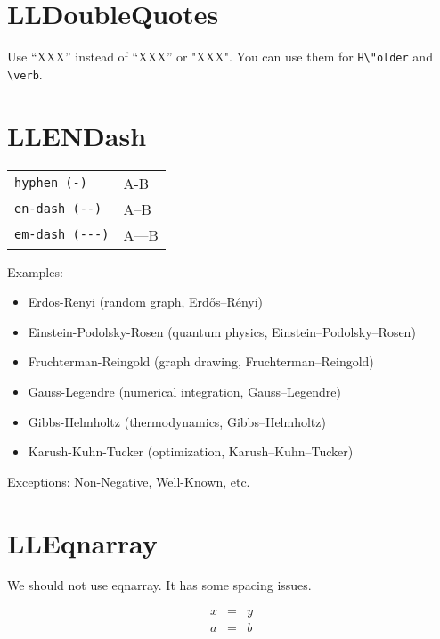 \documentclass[a4paper]{article}
\begin{document}
\section{LLDoubleQuotes}

Use ``XXX'' instead of “XXX” or "XXX".
You can use them for \verb|H\"older| and \verb"\verb".


\section{LLENDash}

\begin{table}[H]
	\centering
	\begin{tabular}{ll}
		\verb|hyphen (-)|    & A-B   \\
		\verb|en-dash (--)|  & A--B  \\
		\verb|em-dash (---)| & A---B
	\end{tabular}
\end{table}

Examples:
\begin{itemize}
	\item Erdos-Renyi (random graph, Erd\H{o}s--R\'enyi)
	\item Einstein-Podolsky-Rosen (quantum physics, Einstein--Podolsky--Rosen)
	\item Fruchterman-Reingold (graph drawing, Fruchterman--Reingold)
	\item Gauss-Legendre (numerical integration, Gauss--Legendre)
	\item Gibbs-Helmholtz (thermodynamics, Gibbs--Helmholtz)
	\item Karush-Kuhn-Tucker (optimization, Karush--Kuhn--Tucker)
\end{itemize}

Exceptions: Non-Negative,  Well-Known, etc.


\section{LLEqnarray}

We should not use eqnarray. It has some spacing issues.

\begin{eqnarray*}
	x & = & y \\
	a & = & b
\end{eqnarray*}
\end{document}
